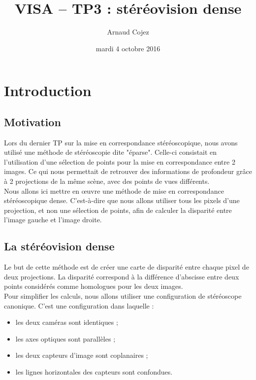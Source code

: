\documentclass[a4paper]{article}
\begin{document}
\title{VISA -- TP3 : stéréovision dense}
\author{Arnaud Cojez}
\date{mardi 4 octobre 2016}

\maketitle

\newpage
\tableofcontents
\newpage

\section{Introduction}

\subsection{Motivation}
Lors du dernier TP sur la mise en correspondance stéréoscopique, nous avons utilisé une méthode de stéréoscopie dite "éparse". Celle-ci consistait en l'utilisation d'une sélection de points pour la mise en correspondance entre 2 images. Ce qui nous permettait de retrouver des informations de profondeur grâce à 2 projections de la même scène, avec des points de vues différents.\\

Nous allons ici mettre en œuvre une méthode de mise en correspondance stéréoscopique dense. C'est-à-dire que nous allons utiliser tous les pixels d'une projection, et non une sélection de points, afin de calculer la disparité entre l'image gauche et l'image droite.

\subsection{La stéréovision dense}

Le but de cette méthode est de créer une carte de disparité entre chaque pixel de deux projections. La disparité correspond à la différence d'abscisse entre deux points considérés comme homologues pour les deux images.\\

Pour simplifier les calculs, nous allons utiliser une configuration de stéréoscope canonique. C'est une configuration dans laquelle :
\begin{itemize}
\item les deux caméras sont identiques ;
\item les axes optiques sont parallèles ;
\item les deux capteurs d’image sont coplanaires ;
\item les lignes horizontales des capteurs sont confondues.\\
\end{itemize}
\end{document}
